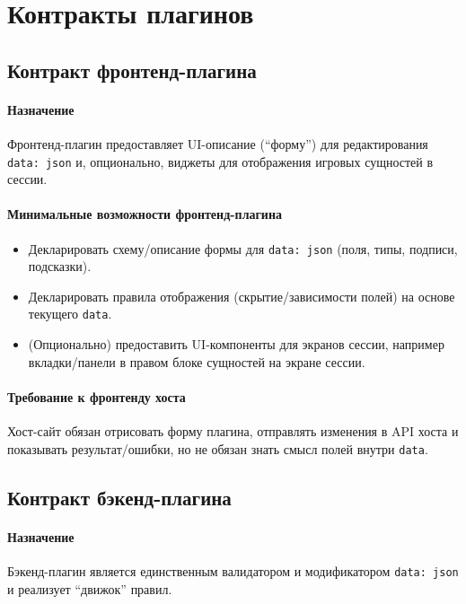 \section{Контракты плагинов}\label{sec:rules-and-plugins:contracts}

\subsection{Контракт фронтенд-плагина}\label{subsec:rules-and-plugins:contracts:frontend}

\paragraph{Назначение}
Фронтенд-плагин предоставляет UI-описание (``форму'') для редактирования \texttt{data: json} и, опционально, виджеты для отображения игровых сущностей в сессии. 

\paragraph{Минимальные возможности фронтенд-плагина}
\begin{itemize}
\item Декларировать схему/описание формы для \texttt{data: json} (поля, типы, подписи, подсказки).
\item Декларировать правила отображения (скрытие/зависимости полей) на основе текущего \texttt{data}.
\item (Опционально) предоставить UI-компоненты для экранов сессии, например вкладки/панели в правом блоке сущностей на экране сессии. 
\end{itemize}

\paragraph{Требование к фронтенду хоста}
Хост-сайт обязан отрисовать форму плагина, отправлять изменения в API хоста и показывать результат/ошибки, но не обязан знать смысл полей внутри \texttt{data}. 

\subsection{Контракт бэкенд-плагина}\label{subsec:rules-and-plugins:contracts:backend}

\paragraph{Назначение}
Бэкенд-плагин является единственным валидатором и модификатором \texttt{data: json} и реализует ``движок'' правил. 

